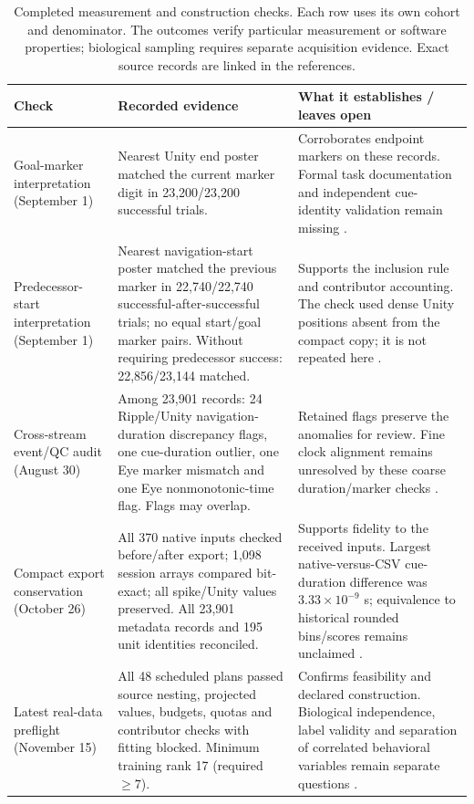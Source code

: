 \documentclass[10pt,a4paper]{article}
\begin{document}
\begin{table}[h!]
\caption{Completed measurement and construction checks. Each row uses its own cohort and denominator. The outcomes verify particular measurement or software properties; biological sampling requires separate acquisition evidence. Exact source records are linked in the references.}
\label{tab:measurementchecks}\small
\begin{tabularx}{\linewidth}{L{30mm}L{67mm}Y}
\toprule
Check & Recorded evidence & What it establishes / leaves open \\
\midrule
Goal-marker interpretation (September 1) & Nearest Unity end poster matched the current marker digit in 23,200/23,200 successful trials. & Corroborates endpoint markers on these records. Formal task documentation and independent cue-identity validation remain missing \cite{markers}. \\
Predecessor-start interpretation (September 1) & Nearest navigation-start poster matched the previous marker in 22,740/22,740 successful-after-successful trials; no equal start/goal marker pairs. Without requiring predecessor success: 22,856/23,144 matched. & Supports the inclusion rule and contributor accounting. The check used dense Unity positions absent from the compact copy; it is not repeated here \cite{markers}. \\
Cross-stream event/QC audit (August 30) & Among 23,901 records: 24 Ripple/Unity navigation-duration discrepancy flags, one cue-duration outlier, one Eye marker mismatch and one Eye nonmonotonic-time flag. Flags may overlap. & Retained flags preserve the anomalies for review. Fine clock alignment remains unresolved by these coarse duration/marker checks \cite{importqc}. \\
Compact export conservation (October 26) & All 370 native inputs checked before/after export; 1,098 session arrays compared bit-exact; all spike/Unity values preserved. All 23,901 metadata records and 195 unit identities reconciled. & Supports fidelity to the received inputs. Largest native-versus-CSV cue-duration difference was $3.33\times10^{-9}$ s; equivalence to historical rounded bins/scores remains unclaimed \cite{compact}. \\
Latest real-data preflight (November 15) & All 48 scheduled plans passed source nesting, projected values, budgets, quotas and contributor checks with fitting blocked. Minimum training rank 17 (required $\geq7$). & Confirms feasibility and declared construction. Biological independence, label validity and separation of correlated behavioral variables remain separate questions \cite{reproduction}. \\
\bottomrule
\end{tabularx}
\end{table}
\end{document}
